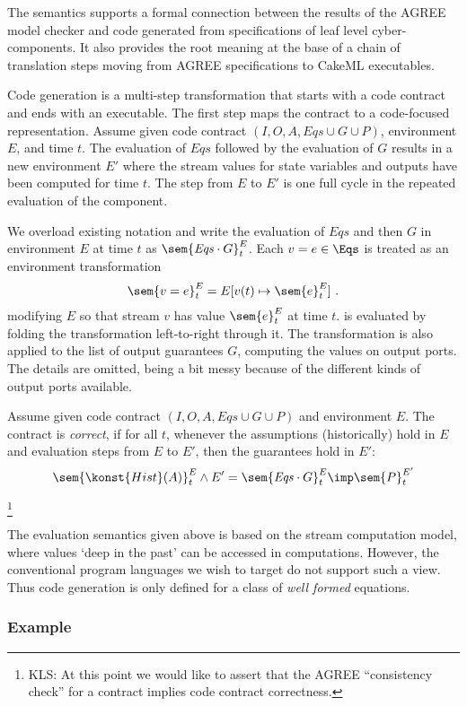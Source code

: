 The semantics supports a formal connection between the results of the
AGREE model checker and code generated from specifications of leaf
level cyber-components. It also provides the root meaning at the base
of a chain of translation steps moving from AGREE specifications to
CakeML executables.

Code generation is a multi-step transformation that starts with a code
contract and ends with an executable. The first step maps the contract
to a code-focused representation. Assume given code contract
$(I,O,A,\mathit{Eqs} \cup G \cup P)$, environment $E$, and time
$t$. The evaluation of $\mathit{Eqs}$ followed by the evaluation of
$G$ results in a new environment $E'$ where the stream values for
state variables and outputs have been computed for time $t$. The step
from $E$ to $E'$ is one full cycle in the repeated evaluation of the
component.

\begin{definition}[Evaluation]
We overload existing notation and write the evaluation of
$\mathit{Eqs}$ and then $G$ in environment $E$ at time $t$ as
$\sem{\mathit{Eqs}\cdot G}^E_t$. Each $v = e \in {\Eqs}$ is treated as
an environment transformation
\[
 \sem{v = e}^E_t = E[v(t) \mapsto\sem{e}^E_t] \ .
\]
modifying $E$ so that stream $v$ has value $\sem{e}^E_t$ at time $t$.
{\Eqs} is evaluated by folding the transformation left-to-right
through it. The transformation is also applied to the list of output
guarantees $G$, computing the values on output ports. The details are
omitted, being a bit messy because of the different kinds of output
ports available.
\end{definition}


\begin{definition}
Assume given code contract $(I,O,A,\mathit{Eqs} \cup G \cup P)$ and
environment $E$.  The contract is \emph{correct}, if for all $t$,
whenever the assumptions (historically) hold in $E$ and evaluation
steps from $E$ to $E'$, then the guarantees hold in $E'$:
\[
\sem{\konst{Hist}(A)}^E_t \land E' = \sem{\mathit{Eqs} \cdot G}^E_t \imp \sem{P}^{E'}_t
\]
\end{definition}
\footnote
{KLS: At this point we would like to assert that the AGREE ``consistency
 check'' for a contract implies code contract correctness.}

The evaluation semantics given above is based on the stream
computation model, where values `deep in the past' can be accessed in
computations. However, the conventional program languages we wish to
target do not support such a view. Thus code generation is only
defined for a class of \emph{well formed} equations.

\begin{definition}[Wellformedness]

\end{definition}

\subsubsection{Example}
